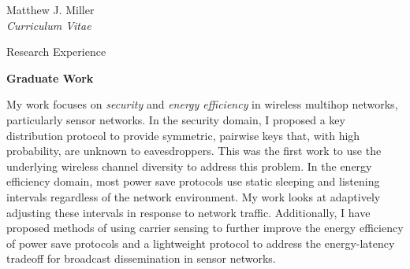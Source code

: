 \documentclass[10pt]{article}
\newenvironment{sublist}{%
    \begin{list}{}{%
        \setlength{\itemsep}{0em}\setlength{\parsep}{0em}%
        \setlength{\topsep}{0em}\setlength{\parskip}{0em}%
    }%
}%
{ \end{list} }
\begin{document}
\begin{cv}{Matthew J. Miller\\{\large \itshape Curriculum Vitae}}
\setlength{\oldcvlabelwidth}{\cvlabelwidth}
\setlength{\cvlabelwidth}{1em}
\begin{cvlist}{Research Experience}
    \item \textbf{Graduate Work}
    \begin{sublist}
        \item 
        My work focuses on \textit{security} and \textit{energy efficiency}
        in wireless
        multihop networks, particularly sensor networks.  In the
        security domain, I proposed a key distribution protocol to
        provide symmetric, pairwise keys that, with high
        probability, are unknown to eavesdroppers.  This was the first
        work to use the underlying wireless channel diversity
        to address this problem.  In the energy efficiency domain, most
        power save protocols use static sleeping and listening intervals
        regardless of the network environment.  My work looks at
        adaptively adjusting these intervals in response to
        network traffic.  Additionally, I have proposed methods of using
        carrier sensing to further improve the energy efficiency of
        power save protocols and a lightweight protocol to address the
        energy-latency tradeoff for broadcast dissemination in sensor
        networks.
    \end{sublist}


\end{cvlist}
\end{cv}
\end{document}
